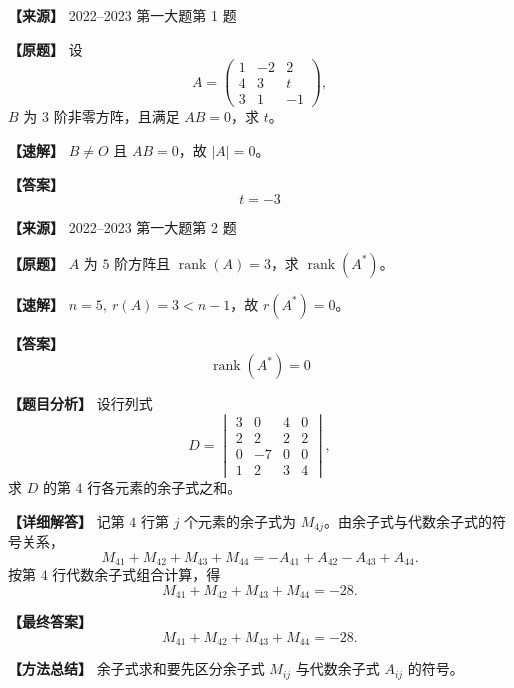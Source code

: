 \documentclass[11pt,a4paper,UTF8]{ctexart}
\newcommand{\rank}{\operatorname{rank}}
\begin{document}
\begin{answerbox}
\textbf{【来源】} 2022--2023 第一大题第 1 题

\textbf{【原题】}
设
\[
A=\begin{pmatrix}1&-2&2\\4&3&t\\3&1&-1\end{pmatrix},
\]
$B$ 为 $3$ 阶非零方阵，且满足 $AB=0$，求 $t$。

\textbf{【速解】}
$B\ne O$ 且 $AB=0$，故 $|A|=0$。

\textbf{【答案】}
\[t=-3\]
\end{answerbox}

\begin{answerbox}
\textbf{【来源】} 2022--2023 第一大题第 2 题

\textbf{【原题】}
$A$ 为 $5$ 阶方阵且 $\rank(A)=3$，求 $\rank(A^*)$。

\textbf{【速解】}
$n=5,\ r(A)=3<n-1$，故 $r(A^*)=0$。

\textbf{【答案】}
\[\rank(A^*)=0\]
\end{answerbox}

\begin{answerbox}
\textbf{【题目分析】} 设行列式
\[
D=\begin{vmatrix}3&0&4&0\\2&2&2&2\\0&-7&0&0\\1&2&3&4\end{vmatrix},
\]
求 $D$ 的第 $4$ 行各元素的余子式之和。

\textbf{【详细解答】} 记第 $4$ 行第 $j$ 个元素的余子式为 $M_{4j}$。由余子式与代数余子式的符号关系，
\[
M_{41}+M_{42}+M_{43}+M_{44}
=-A_{41}+A_{42}-A_{43}+A_{44}.
\]
按第 $4$ 行代数余子式组合计算，得
\[
M_{41}+M_{42}+M_{43}+M_{44}=-28.
\]

\textbf{【最终答案】}
\[
M_{41}+M_{42}+M_{43}+M_{44}=-28.
\]

\textbf{【方法总结】} 余子式求和要先区分余子式 $M_{ij}$ 与代数余子式 $A_{ij}$ 的符号。
\end{answerbox}
\end{document}
